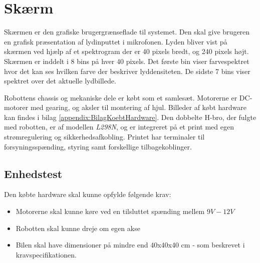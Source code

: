 



\section{Skærm}
Skærmen er den grafiske brugergrænseflade til systemet. Den skal give brugeren en grafisk præsentation af lydinputtet i mikrofonen. Lyden bliver vist på skærmen ved hjælp af et spektrogram der er 40 pixels bredt, og 240 pixels højt.
Skærmen er inddelt i 8 bins på hver 40 pixels. Det første bin viser farvespektret hvor det kan ses hvilken farve der beskriver lyddensiteten. De sidste 7 bins viser spektret over det aktuelle lydbillede.





Robottens chassis og mekaniske dele er købt som et samlesæt. 
Motorerne er DC-motorer med gearing, og aksler til montering af hjul.
Billeder af købt hardware kan findes i bilag \ref{appendix:BilagKoebtHardware}.
Den dobbelte H-bro, der fulgte med robotten, er af modellen \textit{L298N}, og er integreret på et print med egen strømregulering og sikkerhedsafkobling. 
Printet har terminaler til forsyningsspænding, styring samt forskellige tilbagekoblinger.
\newpage
\subsection{Enhedstest}
Den købte hardware skal kunne opfylde følgende krav:
\begin{itemize}
\item Motorerne skal kunne køre ved en tilsluttet spænding mellem $9V - 12V$
\item Robotten skal kunne dreje om egen akse
\item Bilen skal have dimensioner på mindre end 40x40x40 cm - som beskrevet i kravspecifikationen. 
\end{itemize}



